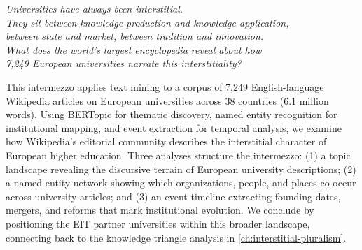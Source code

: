 \documentclass[../main.tex]{subfiles}
\begin{document}


\begin{center}
\end{center}

\vspace{1cm}

\begin{center}
\textit{\large Universities have always been interstitial.\\[0.3em]
They sit between knowledge production and knowledge application,\\[0.3em]
between state and market, between tradition and innovation.\\[0.3em]
What does the world's largest encyclopedia reveal about how\\[0.3em]
7,249 European universities narrate this interstitiality?}
\end{center}

\vspace{1.5cm}

\begin{chapteroverview}
This intermezzo applies text mining to a corpus of 7,249 English-language
Wikipedia articles on European universities across 38 countries (6.1 million words).
Using BERTopic for thematic discovery, named entity recognition for institutional
mapping, and event extraction for temporal analysis, we examine how Wikipedia's
editorial community describes the interstitial character of European higher
education. Three analyses structure the intermezzo: (1) a topic landscape
revealing the discursive terrain of European university descriptions;
(2) a named entity network showing which organizations, people, and places
co-occur across university articles; and (3) an event timeline extracting
founding dates, mergers, and reforms that mark institutional evolution. We
conclude by positioning the EIT partner universities within this broader
landscape, connecting back to the knowledge triangle analysis in
\cref{ch:interstitial-pluralism}.
\end{chapteroverview}
\end{document}
